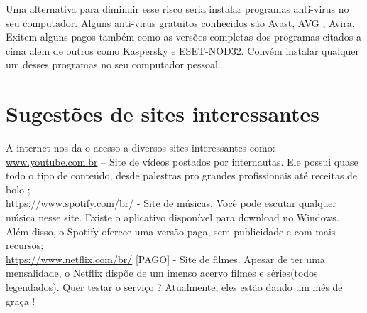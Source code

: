\documentclass[hidelinks,12pt]{article}
\begin{document}
	Uma alternativa para diminuir esse risco seria instalar programas anti-virus no seu computador. Alguns anti-virus gratuitos conhecidos são Avast, AVG , Avira. Exitem alguns pagos também como as versões completas dos programas citados a cima alem de outros como Kaspersky e ESET-NOD32. Convém instalar qualquer um desses programas no seu computador pessoal.


	\section{Sugestões de sites interessantes}
		A internet nos da o acesso a diversos sites interessantes como:\\

		\url{www.youtube.com.br} – Site de vídeos postados por internautas. Ele possui quase todo o tipo de conteúdo, desde palestras pro grandes profissionais até receitas de bolo ;\\

		\url{https://www.spotify.com/br/} - Site de músicas. Você pode escutar qualquer música nesse site. Existe o aplicativo disponível para download no Windows. Além disso, o Spotify oferece uma versão paga, sem publicidade e com mais recursos;\\

		\url{https://www.netflix.com/br/} [PAGO] - Site de filmes. Apesar de ter uma mensalidade, o Netflix dispõe de um imenso acervo filmes e séries(todos legendados). Quer testar o serviço ? Atualmente, eles estão dando um mês de graça !
\end{document}
